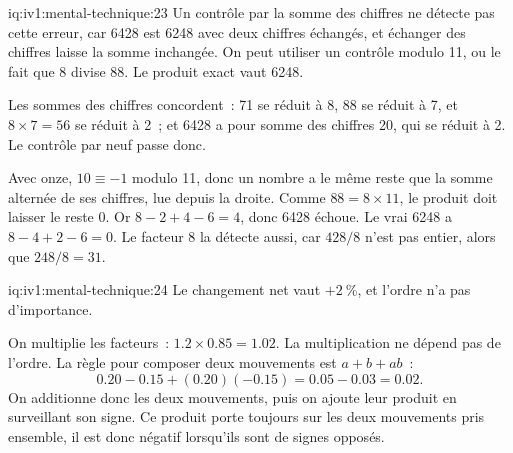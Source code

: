 \begin{solution}{iq:iv1:mental-technique:23}
Un contrôle par la somme des chiffres ne détecte pas cette erreur, car 6428 est 6248 avec deux chiffres échangés, et échanger des chiffres laisse la somme inchangée. On peut utiliser un contrôle modulo 11, ou le fait que 8 divise 88. Le produit exact vaut 6248.

Les sommes des chiffres concordent~: 71 se réduit à 8, 88 se réduit à 7, et $8 \times 7 = 56$ se réduit à 2~; et 6428 a pour somme des chiffres 20, qui se réduit à 2. Le contrôle par neuf passe donc.

Avec onze, $10 \equiv -1$ modulo 11, donc un nombre a le même reste que la somme alternée de ses chiffres, lue depuis la droite. Comme $88 = 8 \times 11$, le produit doit laisser le reste 0. Or $8 - 2 + 4 - 6 = 4$, donc 6428 échoue. Le vrai 6248 a $8 - 4 + 2 - 6 = 0$. Le facteur 8 la détecte aussi, car $428 / 8$ n'est pas entier, alors que $248 / 8 = 31$.

\end{solution}

\begin{solution}{iq:iv1:mental-technique:24}
Le changement net vaut $+2~\%$, et l'ordre n'a pas d'importance.

On multiplie les facteurs~: $1.2 \times 0.85 = 1.02$. La multiplication ne dépend pas de l'ordre. La règle pour composer deux mouvements est $a + b + ab$~:
\[
0.20 - 0.15 + (0.20)(-0.15) = 0.05 - 0.03 = 0.02.
\]
On additionne donc les deux mouvements, puis on ajoute leur produit en surveillant son signe. Ce produit porte toujours sur les deux mouvements pris ensemble, il est donc négatif lorsqu'ils sont de signes opposés.

\end{solution}

